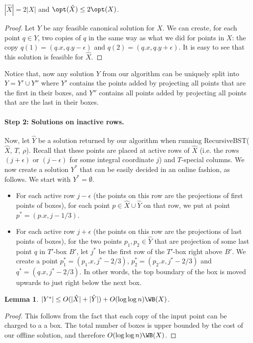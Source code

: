 \documentclass[11pt]{article}
\numberwithin{equation}{section}
\newtheorem{lemma}[theorem]{Lemma}
\theoremstyle{definition}
\theoremstyle{plain}
\begin{document}
\begin{observation}
$|\hat{X}| = 2|X|$ and $\opt(\hat{X}) \leq 2 \opt(X)$. 
\end{observation} 
\begin{proof}
Let $Y$ be any feasible canonical solution for $X$. 
We can create, for each point $q \in Y$, two copies of $q$ in the same way as what we did for points in $X$: the copy $q(1) = (q.x, q.y- \epsilon)$ and $q(2) = (q.x, q.y+\epsilon)$. 
It is easy to see that this solution is feasible for $\hat{X}$.  
\end{proof} 
 
%
Notice that, now any solution $Y$ from our algorithm can be uniquely split into $Y = Y' \cup Y''$ where $Y'$ contains the points added by projecting all points that are the first in their boxes, and $Y''$ contains all points added by projecting all points that are the last in their boxes.
 

\paragraph*{Step 2: Solutions on inactive rows.} 
Now, let $\hat{Y}$ be a solution returned by our algorithm when running {\sc RecursiveBST}($\hat{X}$, $T$, $\rho$). 
Recall that these points are placed at active rows of $\hat{X}$ (i.e. the rows $(j+\epsilon)$ or $(j-\epsilon)$ for some integral coordinate $j$) and $T$-special columns. 
We now create a solution $Y^*$ that can be easily decided in an online fashion, as follows. We start with $Y^* = \emptyset$. 

\begin{itemize}
\item For each active row $j - \epsilon$ (the points on this row are the projections of first points of boxes), for each point $p \in \hat{X} \cup \hat{Y}$ on that row, we put at point $p^* = (p.x, j-1/3)$.  


\item For each active row $j+\epsilon$ (the points on this row are the projections of last points of boxes), for the two points $p_1, p_2 \in \hat{Y}$ that are projection of some last point $q$ in $T'$-box $B'$, let $j^*$ be the first row of the $T'$-box right above $B'$. We create a point $p^*_1 = (p_1.x, j^* - 2/3)$, $p^*_2 = (p_2.x, j^* - 2/3)$ and $q^* = (q.x, j^* - 2/3)$.
In other words, the top boundary of the box is moved upwards to just right below the next box.  
%
\end{itemize}  
%
%
  

\begin{lemma} 
$|Y^*| \leq O(|\hat{X}| + |\hat{Y}|) + O(\log \log n) \WB(X)$.   
\end{lemma} 
\begin{proof}
This follows from the fact that each copy of the input point can be charged to a a box. 
The total number of boxes is upper bounded by the cost of our offline solution, and therefore $O(\log \log n) \WB(X)$. 
\end{proof} 
\end{document}
